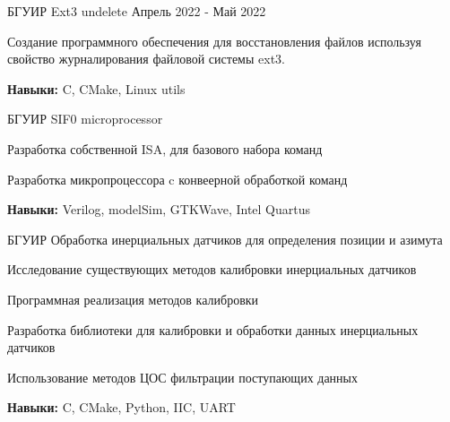 

\begin{cventries}

  \cventry
    {БГУИР} %
    {Ext3 undelete} %
    {} %
    {Апрель 2022 - Май 2022} %
    {
      \begin{cvitems} %
        \item {Создание программного обеспечения для восстановления файлов используя свойство журналирования файловой системы ext3.}
        \item {\textbf{Навыки:} C, CMake, Linux utils}
      \end{cvitems}
    }

  \cventry
    {БГУИР} %
    {SIF0 microprocessor} %
    {} %
    {} %
    {
      \begin{cvitems} %
        \item {Разработка собственной ISA, для базового набора команд}
        \item {Разработка микропроцессора c конвеерной обработкой команд}
        \item {\textbf{Навыки:} Verilog, modelSim, GTKWave, Intel Quartus}
      \end{cvitems}
    }

    \cventry
    {БГУИР} %
    {Обработка инерциальных датчиков для определения позиции и азимута} %
    {} %
    {} %
    {
      \begin{cvitems} %
        \item {Исследование существующих методов калибровки инерциальных датчиков}
        \item {Программная реализация методов калибровки}
        \item {Разработка библиотеки для калибровки и обработки данных инерциальных датчиков}
        \item {Использование методов ЦОС фильтрации поступающих данных}
        \item {\textbf{Навыки:} C, CMake, Python, IIC, UART}
      \end{cvitems}
    }


\end{cventries}
